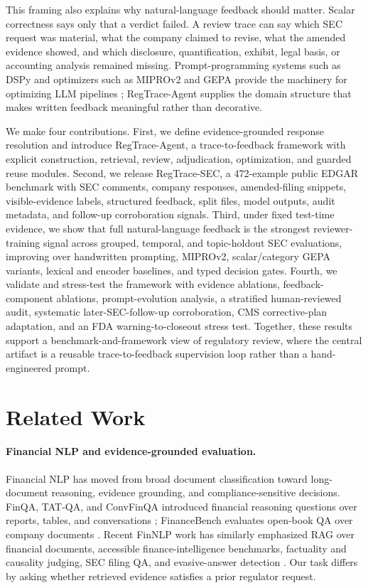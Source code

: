 \documentclass[11pt]{article}
\newcommand{\task}{evidence-grounded response resolution}
\newcommand{\dataset}{RegTrace-SEC}
\newcommand{\framework}{RegTrace-Agent}
\begin{document}
This framing also explains why natural-language feedback should matter. Scalar correctness says only that a verdict failed. A review trace can say which SEC request was material, what the company claimed to revise, what the amended evidence showed, and which disclosure, quantification, exhibit, legal basis, or accounting analysis remained missing. Prompt-programming systems such as DSPy and optimizers such as MIPROv2 and GEPA provide the machinery for optimizing LLM pipelines \citep{khattab2023dspy,agrawal2026gepa}; \framework{} supplies the domain structure that makes written feedback meaningful rather than decorative.

We make four contributions. First, we define \task{} and introduce \framework{}, a trace-to-feedback framework with explicit construction, retrieval, review, adjudication, optimization, and guarded reuse modules. Second, we release \dataset{}, a 472-example public EDGAR benchmark with SEC comments, company responses, amended-filing snippets, visible-evidence labels, structured feedback, split files, model outputs, audit metadata, and follow-up corroboration signals. Third, under fixed test-time evidence, we show that full natural-language feedback is the strongest reviewer-training signal across grouped, temporal, and topic-holdout SEC evaluations, improving over handwritten prompting, MIPROv2, scalar/category GEPA variants, lexical and encoder baselines, and typed decision gates. Fourth, we validate and stress-test the framework with evidence ablations, feedback-component ablations, prompt-evolution analysis, a stratified human-reviewed audit, systematic later-SEC-follow-up corroboration, CMS corrective-plan adaptation, and an FDA warning-to-closeout stress test. Together, these results support a benchmark-and-framework view of regulatory review, where the central artifact is a reusable trace-to-feedback supervision loop rather than a hand-engineered prompt.

\section{Related Work}

\paragraph{Financial NLP and evidence-grounded evaluation.}
Financial NLP has moved from broad document classification toward long-document reasoning, evidence grounding, and compliance-sensitive decisions. FinQA, TAT-QA, and ConvFinQA introduced financial reasoning questions over reports, tables, and conversations \citep{chen2021finqa,zhu2021tatqa,chen2022convfinqa}; FinanceBench evaluates open-book QA over company documents \citep{islam2023financebench}. Recent FinNLP work has similarly emphasized RAG over financial documents, accessible finance-intelligence benchmarks, factuality and causality judging, SEC filing QA, and evasive-answer detection \citep{lithgow2025rag,klimaszewski2025avenibench,lai2025secqa,nuaimi2025evasive,wu2025nli}. Our task differs by asking whether retrieved evidence satisfies a prior regulator request.
\end{document}

